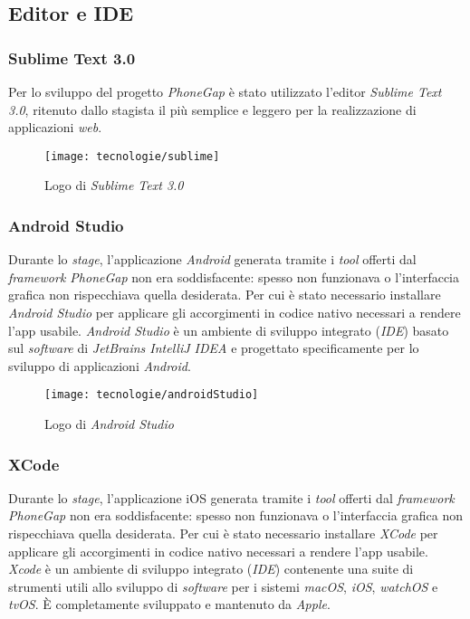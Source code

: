 \subsection{Editor e IDE}

\subsubsection{Sublime Text 3.0}

Per lo sviluppo del progetto \textit{PhoneGap} è stato utilizzato l'editor \textit{Sublime Text 3.0}, ritenuto dallo stagista il più semplice e leggero per la realizzazione di applicazioni \textit{web}. 

\begin{figure}[!h] 
    \centering 
    \texttt{[image: tecnologie/sublime]} 
    \caption{Logo di \textit{Sublime Text 3.0}}
\end{figure}

\subsubsection{Android Studio}

Durante lo \textit{stage}, l'applicazione \textit{Android} generata tramite i \textit{tool} offerti dal \textit{framework PhoneGap} non era soddisfacente: spesso non funzionava o l'interfaccia grafica non rispecchiava quella desiderata. Per cui è stato necessario installare \textit{Android Studio} per applicare gli accorgimenti in codice nativo necessari a rendere l'app usabile. \textit{Android Studio} è un ambiente di sviluppo integrato (\textit{IDE}) basato sul \textit{software} di \textit{JetBrains IntelliJ IDEA} e progettato specificamente per lo sviluppo di applicazioni \textit{Android}.

\begin{figure}[!h] 
    \centering 
    \texttt{[image: tecnologie/androidStudio]} 
    \caption{Logo di \textit{Android Studio}}
\end{figure}

\subsubsection{XCode}

Durante lo \textit{stage}, l'applicazione iOS generata tramite i \textit{tool} offerti dal \textit{framework PhoneGap} non era soddisfacente: spesso non funzionava o l'interfaccia grafica non rispecchiava quella desiderata. Per cui è stato necessario installare \textit{XCode} per applicare gli accorgimenti in codice nativo necessari a rendere l'app usabile. \textit{Xcode} è un ambiente di sviluppo integrato (\textit{IDE}) contenente una suite di strumenti utili allo sviluppo di \textit{software} per i sistemi \textit{macOS}, \textit{iOS}, \textit{watchOS} e \textit{tvOS}. È completamente sviluppato e mantenuto da \textit{Apple}.

